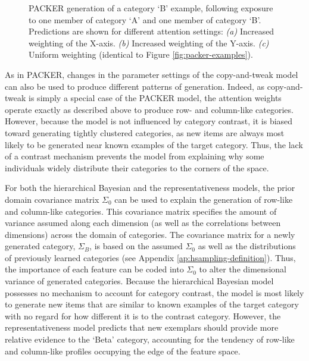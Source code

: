 \documentclass[12pt]{article}
\newcommand\inputpgf[2]{{
\let\pgfimageWithoutPath\pgfimage
\renewcommand{\pgfimage}[2][]{\pgfimageWithoutPath[##1]{#1/##2}}

}}
\begin{document}
\begin{flushleft}
\begin{figure}
    \begin{center} \inputpgf{figs/}{packer-attention-examples.pgf}
    \caption{PACKER generation of a category `B' example, following exposure to
one member of category `A' and one member of category `B'. Predictions are shown
for different attention settings: {\em (a)} Increased weighting of the X-axis.
{\em (b)} Increased weighting of the Y-axis. {\em (c)} Uniform weighting
(identical to Figure \ref{fig:packer-examples}).}
    \label{fig:packer-attention}
    \end{center}
\end{figure}

As in PACKER, changes in the parameter settings of the copy-and-tweak model can
also be used to produce different patterns of generation. Indeed, as
copy-and-tweak is simply a special case of the PACKER model, the attention
weights operate exactly as described above to produce row- and column-like
categories. However, because the model is not influenced by category contrast,
it is biased toward generating tightly clustered categories, as new items are
always most likely to be generated near known examples of the target category.
Thus, the lack of a contrast mechanism prevents the model from explaining why
some individuals widely distribute their categories to the corners of the space.

For both the hierarchical Bayesian and the representativeness models, the prior
domain covariance matrix $\Sigma_0$ can be used to explain the generation of
row-like and column-like categories. This covariance matrix specifies the amount
of variance assumed along each dimension (as well as the correlations between dimensions) across the domain of categories. The covariance matrix for a newly
generated category, $\Sigma_B$, is based on the assumed $\Sigma_0$ as well as
the distributions of previously learned categories (see Appendix
\ref{ap:hsampling-definition}). Thus, the importance of each feature can be
coded into $\Sigma_0$ to alter the dimensional variance of generated categories.
Because the hierarchical Bayesian model possesses no mechanism to account for
category contrast, the model is most likely to generate new items that are
similar to known examples of the target category with no regard for how
different it is to the contrast category. However, the representativeness model
predicts that new exemplars should provide more relative evidence to the `Beta'
category, accounting for the tendency of row-like and column-like profiles
occupying the edge of the feature space.


\end{flushleft}
\end{document}
